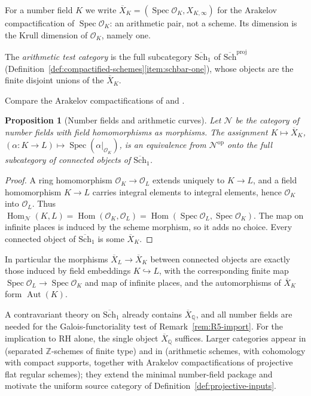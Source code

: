 \documentclass[11pt]{amsart}
\theoremstyle{plain}
\newtheorem{proposition}[theorem]{Proposition}
\theoremstyle{definition}
\theoremstyle{remark}
\numberwithin{equation}{section}
\newcommand{\Q}{\mathbb{Q}}
\newcommand{\Z}{\mathbb{Z}}
\newcommand{\Xbar}{\overline{X}}
\newcommand{\cO}{\mathcal{O}}
\newcommand{\Schbar}{\overline{\mathrm{Sch}}}
\DeclareMathOperator{\Spec}{Spec}
\begin{document}
For a number field $K$ we write $\Xbar_K=(\Spec\cO_K,X_{K,\infty})$ for
the Arakelov compactification of $\Spec\cO_K$: an arithmetic pair, not
a scheme. Its dimension is the Krull dimension of $\cO_K$, namely one.

The \emph{arithmetic test category} is the full subcategory
$\Schbar_1$ of $\Schbar^{\mathrm{proj}}$
(Definition~\ref{def:compactified-schemes}\ref{item:schbar-one}), whose
objects are the finite disjoint unions of the $\Xbar_K$.

Compare the Arakelov compactifications of
\cite[Notation~2.2]{FlachMorin2020DeningerWeilArakelov} and
\cite[\S2]{Deninger2022NoWeil}.

\begin{proposition}[Number fields and arithmetic curves]
\label{prop:A1-number-fields}
Let $\mathcal N$ be the category of number fields with field
homomorphisms as morphisms. The assignment
$K\mapsto\Xbar_K$, $(\alpha:K\to L)\mapsto\Spec(\alpha|_{\cO_K})$,
is an equivalence from $\mathcal N^{\mathrm{op}}$ onto the full
subcategory of connected objects of $\Schbar_1$.
\end{proposition}

\begin{proof}
A ring homomorphism $\cO_K\to\cO_L$ extends uniquely to $K\to L$, and
a field homomorphism $K\to L$ carries integral elements to integral
elements, hence $\cO_K$ into $\cO_L$. Thus
$\operatorname{Hom}_{\mathcal N}(K,L)=\operatorname{Hom}(\cO_K,\cO_L)
=\operatorname{Hom}(\Spec\cO_L,\Spec\cO_K)$. The map on infinite
places is induced by the scheme morphism, so it adds no choice. Every
connected object of $\Schbar_1$ is some $\Xbar_K$.
\end{proof}

In particular the morphisms $\Xbar_L\to\Xbar_K$ between connected
objects are exactly those induced by field embeddings
$K\hookrightarrow L$, with the corresponding finite map
$\Spec\cO_L\to\Spec\cO_K$ and map of infinite places, and the
automorphisms of $\Xbar_K$ form $\operatorname{Aut}(K)$.

A contravariant theory on $\Schbar_1$ already contains $\Xbar_\Q$, and
all
number fields are needed for the Galois-functoriality test of
Remark~\ref{rem:R5-import}. For the implication to RH alone, the single
object $\Xbar_\Q$ suffices. Larger categories appear in
\cite[Conjecture~2, p.~3]{Deninger2010HilbertPolya} (separated
$\Z$-schemes of finite type) and in
\cite[Conjecture~2.3, p.~522]{FlachMorin2020DeningerWeilArakelov}
(arithmetic schemes, with cohomology with compact supports, together
with Arakelov compactifications of projective flat regular schemes);
they extend the minimal number-field package and motivate the uniform
source category of Definition~\ref{def:projective-inputs}.
\end{document}
